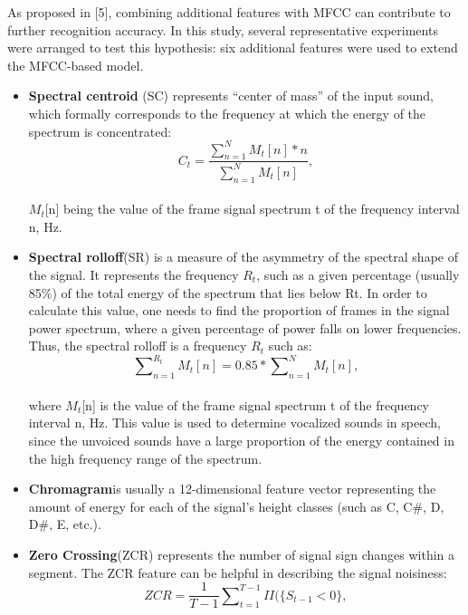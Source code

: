 \documentclass[ams]{U-AizuGT}
\begin{document}
As proposed in [5], combining additional features with MFCC can contribute to further recognition accuracy. In this study, several representative experiments were arranged to test this hypothesis: six additional features were used to extend the MFCC-based model.

\begin{itemize}
\setlength{\leftskip}{-4mm}
\listparindent = 4mm
\item {\textbf{Spectral centroid} (SC) represents “center of mass” of the input sound, which formally corresponds to the frequency at which the energy of the spectrum is concentrated:
\\
\begin{equation}
C_t=\frac{\sum\nolimits_{n=1}^N M_t[n]*n}{\sum\nolimits_{n=1}^N M_t[n]},
\end{equation}
\\
$M_t$[n] being the value of the frame signal spectrum t of the frequency interval n, Hz.
}
\item {\textbf{Spectral rolloff}(SR) is a measure of the asymmetry of the spectral shape of the signal. It represents the frequency $R_t$, such as a given percentage (usually 85\%) of the total
energy of the spectrum that lies below Rt. In order to calculate this value, one needs to find the proportion of frames in the signal power spectrum, where a given percentage of power falls on lower frequencies. Thus, the spectral rolloff is a frequency $R_t$ such as:
\\
\begin{equation}
\sum\nolimits_{n=1}^{R_t} M_t[n]=0.85*\sum\nolimits_{n=1}^N M_t[n],
\end{equation}
\\
where $M_t$[n] is the value of the frame signal spectrum t of the frequency interval n, Hz. This value is used to determine vocalized sounds in speech, since the unvoiced sounds have a large proportion of the energy contained in the high frequency range of the spectrum.
}
\item {\textbf{Chromagram}is usually a 12-dimensional feature vector representing the amount of energy for each of the signal’s height classes (such as C, C\#, D, D\#, E, etc.).}
\item {\textbf{Zero Crossing}(ZCR) represents the number of signal sign changes within a segment. The ZCR feature can be helpful in describing the signal noisiness:
\\
\begin{equation}
ZCR=\frac{1}{T-1}\sum\nolimits_{t=1}^{T-1} II(\{S_{t-1}<0\},

\end{equation}}
\end{itemize}
\end{document}
